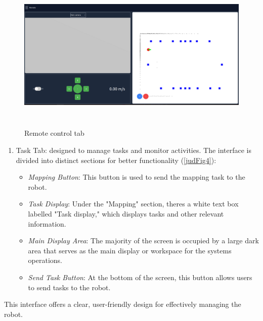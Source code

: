 \documentclass[../../main]{subfiles}
\begin{document}
    \begin{figure}
    \centering
    \includegraphics[width=6.26806in,height=2.95694in]{img/image005.png}
    \caption{Remote control tab}
    \label{judFig3}
    \end{figure}
    
    \begin{enumerate}
    \def\labelenumi{\arabic{enumi}.}
    \setcounter{enumi}{2}
    \item
      Task Tab: designed to manage tasks and monitor activities. The
      interface is divided into distinct sections for better functionality
      (\cref{judFig4}):
    
      \begin{itemize}
      \item
        \emph{Mapping Button}: This button is used to send the mapping task
        to the robot.
      \item
        \emph{Task Display}: Under the "Mapping" section,
        there\textquotesingle s a white text box labelled "Task display,"
        which displays tasks and other relevant information.
      \item
        \emph{Main Display Area}: The majority of the screen is occupied by
        a large dark area that serves as the main display or workspace for
        the system\textquotesingle s operations.
      \item
        \emph{Send Task Button}: At the bottom of the screen, this button
        allows users to send tasks to the robot.
      \end{itemize}
    \end{enumerate}
    
    This interface offers a clear, user-friendly design for effectively
    managing the robot.
    
\end{document}
